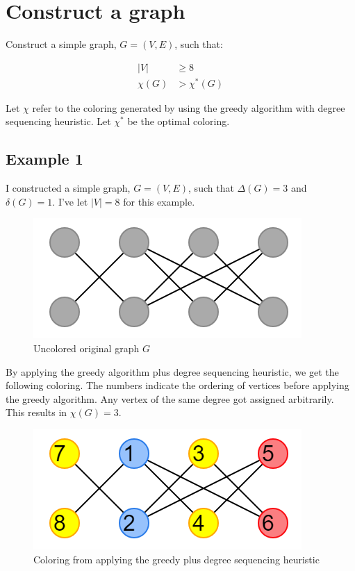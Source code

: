 \documentclass{article}
\begin{document}
\section*{Construct a graph}
Construct a simple graph, \(G = (V, E)\), such that:

\begin{align}
|V| &\geq 8 \\
\chi(G) &> \chi^{*}(G)
\end{align}

Let \(\chi\) refer to the coloring generated by using the greedy algorithm with degree sequencing heuristic. Let \(\chi^{*}\) be the optimal coloring.

\subsection*{Example 1}
I constructed a simple graph, \(G = (V, E)\), such that \(\Delta(G) = 3\) and \(\delta(G) = 1\). I've let \(|V| = 8\) for this example.

\begin{figure}[H]
\centering
\includegraphics[scale=0.5]{graph-1.png}
\caption{Uncolored original graph \(G\)}
\end{figure}

By applying the greedy algorithm plus degree sequencing heuristic, we get the following coloring. The numbers indicate the ordering of vertices before applying the greedy algorithm. Any vertex of the same degree got assigned arbitrarily. This results in \(\chi(G) = 3\).

\begin{figure}[H]
\centering
\includegraphics[scale=0.5]{graph-2.png}
\caption{Coloring from applying the greedy plus degree sequencing heuristic}
\end{figure}
\end{document}
